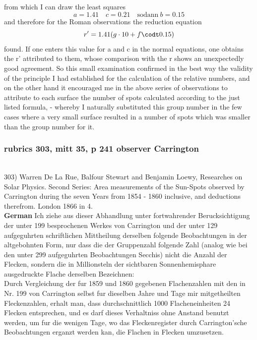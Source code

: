 \documentclass[12pt]{article}
\begin{document}
from which I can draw the least squares 
$$a=1.41 \quad c=0.21 \quad \text{sodann}\ b=0.15$$
and therefore for the Roman observations the reduction equation
$$r' = 1.41(g\cdot 10 + f\codt 0.15)$$
found. If one enters this value for a and c in the normal equations, one obtains the r' attributed to them, whose comparison with the r shows an unexpectedly good agreement. So this small examination confirmed in the best way the validity of the principle I had established for the calculation of the relative numbers, and on the other hand it encouraged me in the above series of observations to attribute to each surface the number of spots calculated according to the just listed formula, - whereby I naturally substituted this group number in the few cases where a very small surface resulted in a number of spots which was smaller than the group number for it.

\subsubsection{rubrics 303, mitt 35, p 241 observer Carrington}\label{rubrics 303, carrington}\\

303) Warren De La Rue, Balfour Stewart and Benjamin Loewy, Researches on Solar Physics. Second Series: Area measurements of the Sun-Spots observed by Carrington during the seven Years from 1854 - 1860 inclusive, and deductions therefrom. London 1866 in 4.\\

\textbf{German}
Ich ziehe aus dieser Abhandlung unter fortwahrender Berucksichtigung der unter 199 besprochenen Werkes von Carrington und der unter 129 aufgeguhrten schriftlichen Mittheilung derselben folgende Beobachtungen in der altgebohnten Form, nur dass die der Gruppenzahl folgende Zahl (analog wie bei den unter 299 aufgeguhrten Beobachtungen Secchis) nicht die Anzahl der Flecken, sondern die in Millionsteln der sichtbaren Sonnenhemisphare ausgedruckte Flache derselben Bezeichnen:\\

Durch Vergleichung der fur 1859 und 1860 gegebenen Flachenzahlen mit den in Nr. 199 von Carrington selbst fur dieselben Jahre und Tage mir mitgetheilten Fleckenzahlen, erhalt man, dass durchschnittlich 1000 Flacheneinheiten 24 Flecken entsprechen, und es darf dieses Verhaltniss ohne Anstand benutzt werden, um fur die wenigen Tage, wo das Fleckenregister durch Carrington'sche Beobachtungen erganzt werden kan, die Flachen in Flecken umzusetzen.\\
\end{document}
